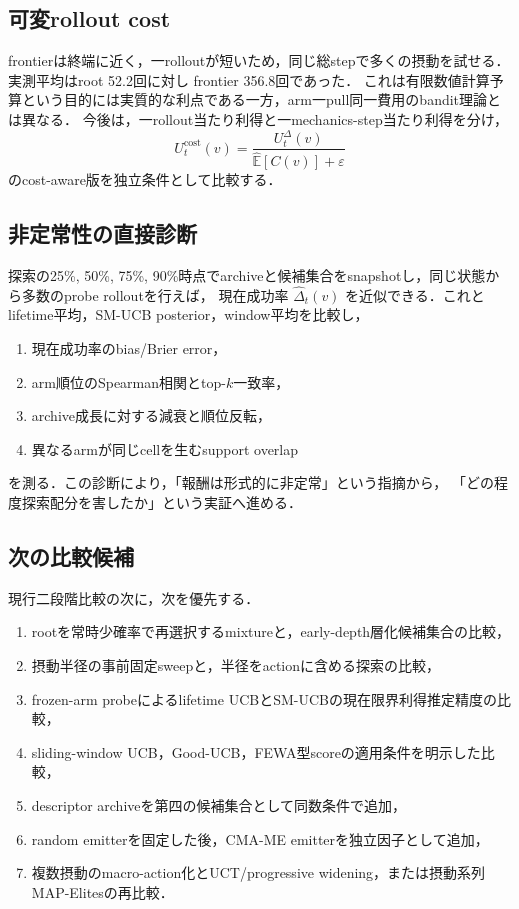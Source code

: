 \documentclass[a4paper,11pt]{ltjsarticle}
\begin{document}
\subsection{可変rollout cost}

frontierは終端に近く，一rolloutが短いため，同じ総stepで多くの摂動を試せる．実測平均はroot 52.2回に対し
frontier 356.8回であった．
これは有限数値計算予算という目的には実質的な利点である一方，arm一pull同一費用のbandit理論とは異なる．
今後は，一rollout当たり利得と一mechanics-step当たり利得を分け，
\begin{equation}
  U_t^{\mathrm{cost}}(v)
  =\frac{U_t^{\Delta}(v)}{\widehat{\mathbb E}[C(v)]+\varepsilon}
\end{equation}
のcost-aware版を独立条件として比較する．

\subsection{非定常性の直接診断}

探索の25\%, 50\%, 75\%, 90\%時点でarchiveと候補集合をsnapshotし，同じ状態から多数のprobe rolloutを行えば，
現在成功率 \(\widehat\Delta_t(v)\) を近似できる．これとlifetime平均，SM-UCB posterior，window平均を比較し，
\begin{enumerate}
  \item 現在成功率のbias/Brier error，
  \item arm順位のSpearman相関とtop-\(k\)一致率，
  \item archive成長に対する減衰と順位反転，
  \item 異なるarmが同じcellを生むsupport overlap
\end{enumerate}
を測る．この診断により，「報酬は形式的に非定常」という指摘から，
「どの程度探索配分を害したか」という実証へ進める．

\subsection{次の比較候補}

現行二段階比較の次に，次を優先する．
\begin{enumerate}
  \item rootを常時少確率で再選択するmixtureと，early-depth層化候補集合の比較，
  \item 摂動半径の事前固定sweepと，半径をactionに含める探索の比較，
  \item frozen-arm probeによるlifetime UCBとSM-UCBの現在限界利得推定精度の比較，
  \item sliding-window UCB，Good-UCB，FEWA型scoreの適用条件を明示した比較，
  \item descriptor archiveを第四の候補集合として同数条件で追加，
  \item random emitterを固定した後，CMA-ME emitterを独立因子として追加，
  \item 複数摂動のmacro-action化とUCT/progressive widening，または摂動系列MAP-Elitesの再比較．
\end{enumerate}
\end{document}
